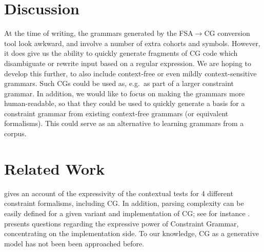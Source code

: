 \documentclass[11pt]{article}
\begin{document}
\section{Discussion}
At the time of writing, the grammars generated by the FSA$\rightarrow$CG
conversion tool look awkward, and involve a number of extra cohorts and symbols.
However, it does give us the ability to quickly generate fragments of CG code
which disambiguate or rewrite input based on a regular expression.
We are hoping to develop this further, to also include context-free or even
mildly context-sensitive grammars.
Such CGs could be used as, e.g.\ as part of a larger constraint grammar.
In addition, we would like to focus on making the grammars more human-readable,
so that they could be used to quickly generate a basis for a constraint grammar
from existing context-free grammars (or equivalent formalisms).
This could serve as an alternative to learning grammars from a corpus.


\section{Related Work}
 gives an account of the expressivity of
the contextual tests for 4 different constraint formalisms, including CG. 
In addition, parsing complexity can be easily defined for a given variant and 
implementation of CG; see for instance .
 presents questions regarding the expressive power
of Constraint Grammar, concentrating on the implementation side.
To our knowledge, CG as a generative model has not been been approached before.



\end{document}
